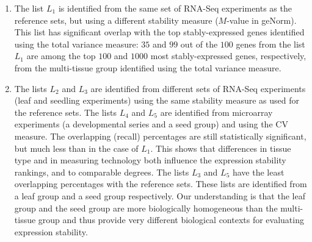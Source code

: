 \documentclass[11pt, a4paper]{article}
\begin{document}
\begin{enumerate}
    \item
	The list $L_1$ is identified from the same set of RNA-Seq experiments as the
	reference sets, but using a different stability measure ($M$-value in
	geNorm). This list has significant overlap with the top
	stably-expressed genes identified using the total variance measure:
	$35$ and $99$ out of the $100$ genes from the list $L_1$ are among the
	top $100$ and $1000$ most stably-expressed genes, respectively, from the
	multi-tissue group identified using the total variance measure. 
    \item
	The lists $L_2$ and $L_3$ are identified from different sets of
	RNA-Seq experiments (leaf and seedling experiments) using the same
	stability measure as used for the reference sets. The lists $L_4$ and $L_5$ are
	identified from microarray experiments (a developmental series and a
	seed group) and using the CV measure. The overlapping (recall)
	percentages are still statistically significant, but much less than in
	the case of $L_1$.  This shows that differences in tissue type and in
	measuring technology both influence the expression stability rankings,
	and to comparable degrees. The lists $L_3$ and $L_5$ have the least
	overlapping percentages with the reference sets. These lists are
	identified from a leaf group and a seed group respectively.
	Our understanding is that the leaf group and the seed group are more
	biologically homogeneous than the multi-tissue group and thus provide
	very different biological contexts for evaluating expression stability.
\end{enumerate}


\end{document}
